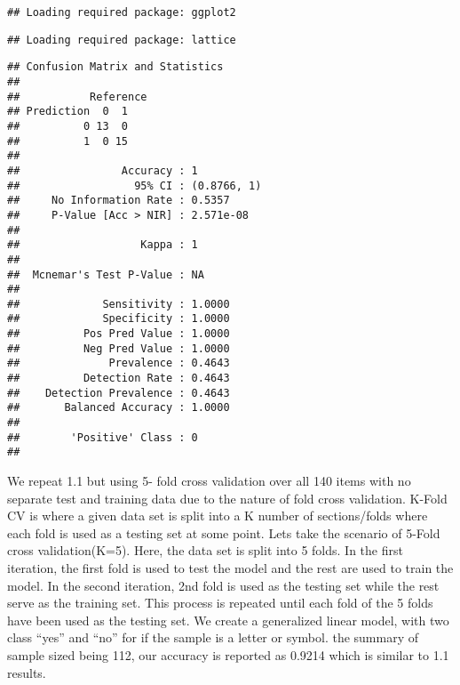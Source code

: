 \documentclass[
]{article}
\newenvironment{Shaded}{\begin{snugshade}}{\end{snugshade}}
\newcommand{\AttributeTok}[1]{\textcolor[rgb]{0.77,0.63,0.00}{#1}}
\newcommand{\CommentTok}[1]{\textcolor[rgb]{0.56,0.35,0.01}{\textit{#1}}}
\newcommand{\FunctionTok}[1]{\textcolor[rgb]{0.00,0.00,0.00}{#1}}
\newcommand{\NormalTok}[1]{#1}
\newcommand{\OtherTok}[1]{\textcolor[rgb]{0.56,0.35,0.01}{#1}}
\newcommand{\SpecialCharTok}[1]{\textcolor[rgb]{0.00,0.00,0.00}{#1}}
\newcommand{\StringTok}[1]{\textcolor[rgb]{0.31,0.60,0.02}{#1}}
\begin{document}
\begin{verbatim}
## Loading required package: ggplot2
\end{verbatim}

\begin{verbatim}
## Loading required package: lattice
\end{verbatim}

\begin{Shaded}
\end{Shaded}

\begin{verbatim}
## Confusion Matrix and Statistics
## 
##           Reference
## Prediction  0  1
##          0 13  0
##          1  0 15
##                                      
##                Accuracy : 1          
##                  95% CI : (0.8766, 1)
##     No Information Rate : 0.5357     
##     P-Value [Acc > NIR] : 2.571e-08  
##                                      
##                   Kappa : 1          
##                                      
##  Mcnemar's Test P-Value : NA         
##                                      
##             Sensitivity : 1.0000     
##             Specificity : 1.0000     
##          Pos Pred Value : 1.0000     
##          Neg Pred Value : 1.0000     
##              Prevalence : 0.4643     
##          Detection Rate : 0.4643     
##    Detection Prevalence : 0.4643     
##       Balanced Accuracy : 1.0000     
##                                      
##        'Positive' Class : 0          
## 
\end{verbatim}

We repeat 1.1 but using 5- fold cross validation over all 140 items with
no separate test and training data due to the nature of fold cross
validation. K-Fold CV is where a given data set is split into a K number
of sections/folds where each fold is used as a testing set at some
point. Lets take the scenario of 5-Fold cross validation(K=5). Here, the
data set is split into 5 folds. In the first iteration, the first fold
is used to test the model and the rest are used to train the model. In
the second iteration, 2nd fold is used as the testing set while the rest
serve as the training set. This process is repeated until each fold of
the 5 folds have been used as the testing set. We create a generalized
linear model, with two class ``yes'' and ``no'' for if the sample is a
letter or symbol. the summary of sample sized being 112, our accuracy is
reported as 0.9214 which is similar to 1.1 results.
\end{document}
